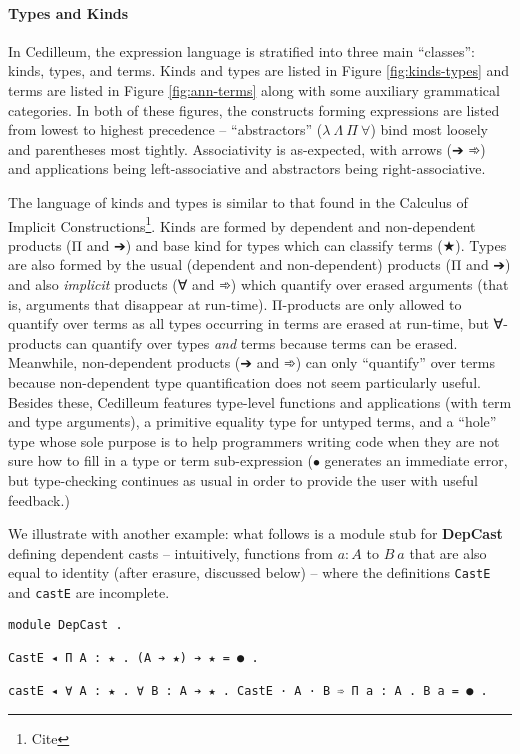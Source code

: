 \documentclass{article}
\begin{document}
\paragraph{Types and Kinds}

In Cedilleum, the expression language is stratified into three main ``classes'':
kinds, types, and terms. Kinds and types are listed in Figure
\ref{fig:kinds-types} and terms are listed in Figure \ref{fig:ann-terms} along
with some auxiliary grammatical categories. In both of these figures, the
constructs forming expressions are listed from lowest to highest precedence --
``abstractors'' ($\lambda\ \Lambda\ \Pi\ \forall$) bind most loosely and
parentheses most tightly. Associativity is as-expected, with arrows (➔ ➾) and
applications being left-associative and abstractors being right-associative.

The language of kinds and types is similar to that found in the Calculus of
Implicit Constructions\footnote{Cite}. Kinds are formed by dependent and
non-dependent products (Π and ➔) and base kind for types which can classify
terms (★). Types are also formed by the usual (dependent and non-dependent)
products (Π and ➔) and also \textit{implicit} products (∀ and ➾) which quantify
over erased arguments (that is, arguments that disappear at run-time).
Π-products are only allowed to quantify over terms as all types occurring in
terms are erased at run-time, but ∀-products can quantify over types
\textit{and} terms because terms can be erased. Meanwhile, non-dependent
products (➔ and ➾) can only ``quantify'' over terms because non-dependent type
quantification does not seem particularly useful. Besides these, Cedilleum
features type-level functions and applications (with term and type arguments), a
primitive equality type for untyped terms, and a ``hole'' type whose sole
purpose is to help programmers writing code when they are not sure how to fill
in a type or term sub-expression ($\bullet$ generates an immediate error, but
type-checking continues as usual in order to provide the user with useful feedback.)

We illustrate with another example: what follows is a module stub for
\textbf{DepCast} defining dependent casts -- intuitively, functions from $a : A$
to $B\ a$ that are also equal to identity (after erasure, discussed below) --
where the definitions \texttt{CastE} and \texttt{castE} are incomplete.

\begin{verbatim}
module DepCast .

CastE ◂ Π A : ★ . (A ➔ ★) ➔ ★ = ● .

castE ◂ ∀ A : ★ . ∀ B : A ➔ ★ . CastE · A · B ➾ Π a : A . B a = ● .
\end{verbatim}
\end{document}
